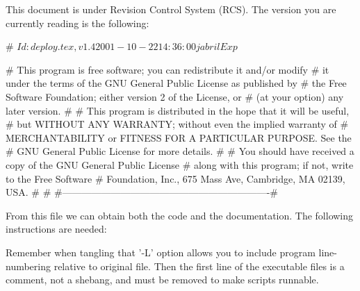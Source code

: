 \documentclass[11pt]{article}
\def\nwendcode{\endtrivlist \endgroup} %
\let\nwdocspar=\par                    %
\begin{document}

This document is under Revision Control System (RCS). The version you are currently reading is the following:

\nwenddocs{}\endmoddef
# $Id: deploy.tex,v 1.4 2001-10-22 14:36:00 jabril Exp $
\nwendcode{}\nwdocspar


\nwenddocs{}\endmoddef
# This program is free software; you can redistribute it and/or modify
# it under the terms of the GNU General Public License as published by
# the Free Software Foundation; either version 2 of the License, or
# (at your option) any later version.
# 
# This program is distributed in the hope that it will be useful,
# but WITHOUT ANY WARRANTY; without even the implied warranty of
# MERCHANTABILITY or FITNESS FOR A PARTICULAR PURPOSE.  See the
# GNU General Public License for more details.
# 
# You should have received a copy of the GNU General Public License
# along with this program; if not, write to the Free Software
# Foundation, Inc., 675 Mass Ave, Cambridge, MA 02139, USA.
# 
# #----------------------------------------------------------------#
\nwendcode{}\nwdocspar

\newpage %


From this file we can obtain both the code and the
documentation. The following instructions are needed:


Remember when tangling that '-L' option allows you to include program line-numbering relative to original {\noweb} file. Then the first line of the executable files is a comment, not a shebang, and must be removed to make scripts runnable.
\end{document}
